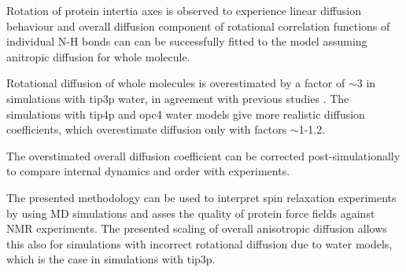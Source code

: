 \documentclass[pre,aps,floatfix,authordate1-4,twocolumn]{revtex4-1}
\begin{document}
Rotation of protein intertia axes is observed to experience linear
diffusion behaviour and overall diffusion component of rotational 
correlation functions of individual N-H bonds can can be successfully 
fitted to the model assuming anitropic diffusion for whole molecule.

Rotational diffusion of whole molecules is overestimated by a factor
of $\sim$3 in simulations with tip3p water, in agreement with previous
studies \cite{??}. The simulations with tip4p and opc4 water models
give more realistic diffusion coefficients, which overestimate diffusion
only with factors $\sim$1-1.2. 

The overstimated overall diffusion
coefficient can be corrected post-simulationally to compare internal dynamics
and order with experiments. 

The presented methodology can be used to interpret spin relaxation experiments
by using MD simulations \cite{??} and asses the quality of protein force fields
against NMR experiments. The presented scaling of overall anisotropic diffusion
allows this also for simulations with incorrect rotational diffusion due to water
models, which is the case in simulations with tip3p. 

\begin{acknowledgments}
\end{acknowledgments}


\end{document}
